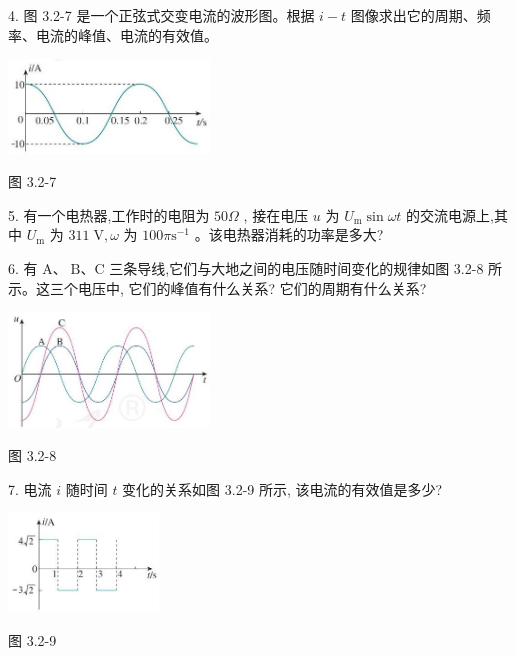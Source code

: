 \documentclass[10pt]{article}
\begin{document}
4. 图 3.2-7 是一个正弦式交变电流的波形图。根据 \(i - t\) 图像求出它的周期、频率、电流的峰值、电流的有效值。

\begin{center}
\includegraphics[max width=0.4\textwidth]{images/01910e72-c5b7-7ed5-a6d4-fb3a5faefc32_62_988731.jpg}
\end{center}

图 3.2-7

5. 有一个电热器,工作时的电阻为 \({50\Omega }\) , 接在电压 \(u\) 为 \({U}_{\mathrm{m}}\sin {\omega t}\) 的交流电源上,其中 \({U}_{\mathrm{m}}\) 为 \({311}\mathrm{\;V},\omega\) 为 \({100\pi }{\mathrm{s}}^{-1}\) 。该电热器消耗的功率是多大?

6. 有 \(\mathrm{A}\text{、}\mathrm{\;B}\text{、}\mathrm{C}\) 三条导线,它们与大地之间的电压随时间变化的规律如图 3.2-8 所示。这三个电压中, 它们的峰值有什么关系? 它们的周期有什么关系?

\begin{center}
\includegraphics[max width=0.4\textwidth]{images/01910e72-c5b7-7ed5-a6d4-fb3a5faefc32_62_253923.jpg}
\end{center}

图 3.2-8

7. 电流 \(i\) 随时间 \(t\) 变化的关系如图 3.2-9 所示, 该电流的有效值是多少?

\begin{center}
\includegraphics[max width=0.3\textwidth]{images/01910e72-c5b7-7ed5-a6d4-fb3a5faefc32_62_441588.jpg}
\end{center}

图 3.2-9
\end{document}
